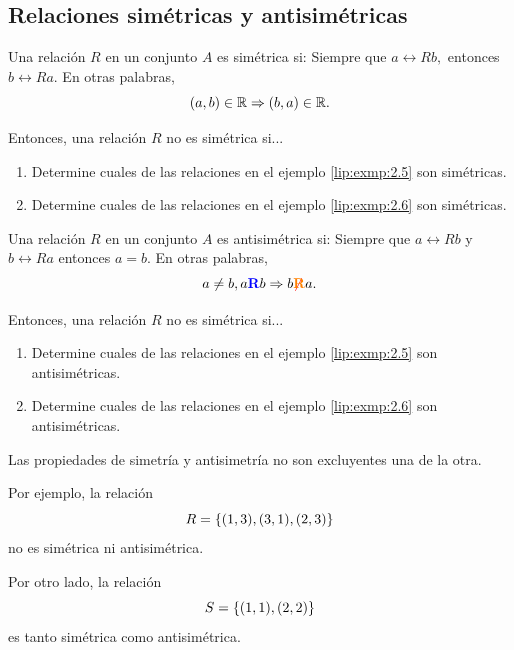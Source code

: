 \subsection{Relaciones sim\'etricas y antisim\'etricas}


	Una relación $R$ en un conjunto $A$ es sim\'etrica si: Siempre que $a\rel{R}b,$ entonces $b\rel{R}a.$  En otras palabras, 
	$$
	(a,b)\in \mathbb{R} \Rightarrow (b,a)\in \mathbb{R}.
	$$
	
	Entonces, una relación $R$ no es sim\'etrica si...
 


	\begin{problema}
		\label{lip:exmp:2.7}
		\begin{enumerate}
			\item   Determine cuales de las relaciones en el ejemplo \ref{lip:exmp:2.5} son sim\'etricas.
			\item Determine cuales de las relaciones en el ejemplo \ref{lip:exmp:2.6} son sim\'etricas.
		\end{enumerate}
		
	\end{problema}




	Una relación $R$ en un conjunto $A$ es antisim\'etrica si: Siempre que $a\rel{R}b$ y $b\rel{R}a$ entonces $a=b.$  En otras palabras, 
	$$
	a\neq b, a{ {\color{blue}\textbf{R}} }b \Rightarrow b{ {\color{red}\not}{\color{orange}\textbf{R}} }a.
	$$
	
	Entonces, una relación $R$ no es sim\'etrica si...
 


	\begin{problema}
		\label{lip:exmp:2.8}
		\begin{enumerate}
			\item   Determine cuales de las relaciones en el ejemplo \ref{lip:exmp:2.5} son antisim\'etricas.
			\item Determine cuales de las relaciones en el ejemplo \ref{lip:exmp:2.6} son antisim\'etricas.
		\end{enumerate}
		
	\end{problema}



	\begin{rem}
		Las propiedades de simetría y antisimetría no son excluyentes una de la otra. 
		
		Por ejemplo, la relación $$R=\left\{ (1,3),(3,1),(2,3) \right\}$$ no es sim\'etrica ni antisim\'etrica. 
		
		Por otro lado, la relación $$S=\left\{ (1,1),(2,2) \right\}$$ es tanto sim\'etrica como antisim\'etrica.
	\end{rem}
	


